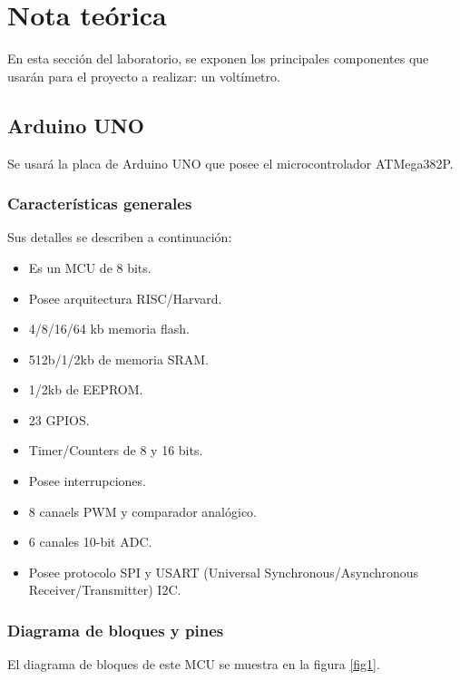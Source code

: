 \section{Nota teórica}
En esta sección del laboratorio, se exponen los principales componentes que usarán para el proyecto a realizar: un voltímetro.
\subsection*{Arduino UNO}
Se usará la placa de Arduino UNO que posee el microcontrolador ATMega382P.

\subsubsection*{Características generales}
Sus detalles se describen a continuación:
\begin{itemize}
\item Es un MCU de 8 bits.
\item Posee arquitectura RISC/Harvard.
\item 4/8/16/64 kb memoria flash.
\item 512b/1/2kb de memoria SRAM.
\item 1/2kb de EEPROM.
\item 23 GPIOS.
\item Timer/Counters de 8 y 16 bits.
\item Posee interrupciones.
\item 8 canaels PWM y comparador analógico.
\item 6 canales 10-bit ADC.
\item Posee protocolo SPI y USART (Universal Synchronous/Asynchronous Receiver/Transmitter) I2C.
\end{itemize}
\subsubsection*{Diagrama de bloques y pines}
El diagrama de bloques de este MCU se muestra en la figura \ref{fig1}.

